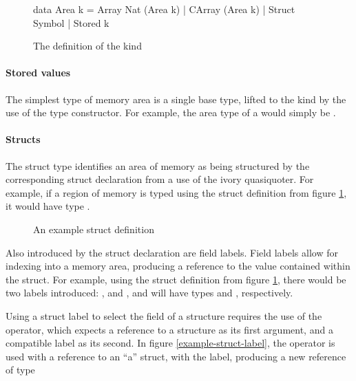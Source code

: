\begin{figure}[h]
\begin{code}
data Area k = Array Nat (Area k)
            | CArray (Area k)
            | Struct Symbol
            | Stored k
\end{code}
\caption{The definition of the  kind}
\end{figure}

\paragraph{Stored values}
The simplest type of memory area is a single base type, lifted to the 
kind by the use of the  type constructor.  For example, the area type
of a  would simply be .

\paragraph{Structs}
The struct type identifies an area of memory as being structured by the
corresponding struct declaration from a use of the ivory quasiquoter.  For
example, if a region of memory is typed using the struct definition from figure
\ref{example-struct}, it would have type .

\begin{figure}[h]
\begin{code}
\end{code}
\caption{An example struct definition}
\label{example-struct}
\end{figure}

Also introduced by the struct declaration are field labels.  Field labels allow
for indexing into a memory area, producing a reference to the value contained
within the struct.  For example, using the struct definition from figure
\ref{example-struct}, there would be two labels introduced: , and
, and will have types  and , respectively.

Using a struct label to select the field of a structure requires the use of the
\cd{(\mytilde>)} operator, which expects a reference to a structure as its first
argument, and a compatible label as its second.  In figure
\ref{example-struct-label}, the \cd{(\mytilde>)} operator is used with a reference to
an ``a'' struct, with the  label, producing a new reference of type

